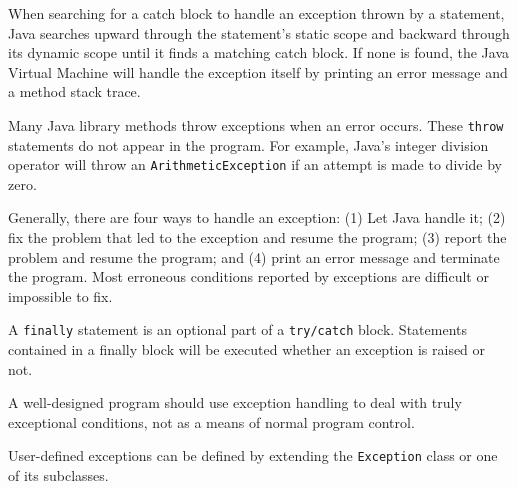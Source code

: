 \begin{SMBL}
\item  When searching for a catch block to handle an exception
thrown by a statement, Java searches upward through the
statement's static scope and backward through its dynamic
scope until it finds a matching catch block.  If none is
found, the Java Virtual Machine will handle the exception itself
by printing an error message and a method stack trace.

\item  Many Java library methods throw exceptions when an
error occurs.  These {\tt throw} statements do not appear in the
program.  For example, Java's integer division operator will throw an
{\tt ArithmeticException} if an attempt is made to divide by zero.

\item  Generally, there are four ways to handle an exception: (1)
Let Java handle it; (2) fix the problem that led to the exception and
resume the program; (3) report the problem and resume the program; and
(4) print an error message and terminate the program.  Most erroneous
conditions reported by exceptions are difficult or impossible to fix.

\item  A {\tt finally} statement is an optional part of a
{\tt try/catch} block.  Statements contained in a finally block will be
executed whether an exception is raised or not.

\item  A well-designed program should use exception handling to
deal with truly exceptional conditions, not as a means
of normal program control.

\item  User-defined exceptions can be defined by extending the
{\tt Exception} class or one of its subclasses.
\end{SMBL}


\secANSHleft

